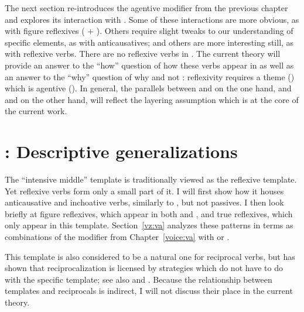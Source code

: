 The next section re-introduces the agentive modifier {\va} from the previous chapter and explores its interaction with {\vz}. Some of these interactions are more obvious, as with figure reflexives ({\va} + {\pz}). Others require slight tweaks to our understanding of specific elements, as with anticausatives; and others are more interesting still, as with reflexive verbs. There are no reflexive verbs in {\tnif}. The current theory will provide an answer to the ``how'' question of how these verbs appear in {\thit} as well as an answer to the ``why'' question of why {\thit} and not {\tnif}: reflexivity requires a theme (\vz) which is agentive (\va). In general, the parallels between {\tkal} and {\thif} on the one hand, and {\tpie} and {\thit} on the other hand, will reflect the layering assumption which is at the core of the current work. 


\section{\thit: Descriptive generalizations} \label{vz:thit}
The ``intensive middle'' template {\thit} is traditionally viewed as the reflexive template. Yet reflexive verbs form only a small part of it. I will first show how it houses anticausative and inchoative verbs, similarly to {\tnif}, but not passives. I then look briefly at figure reflexives, which appear in both {\tnif} and {\thit}, and true reflexives, which only appear in this template. Section~\ref{vz:va} analyzes these patterns in terms as combinations of the modifier {\va} from Chapter~\ref{voice:va} with {\vz} or {\pz}.

This template is also considered to be a natural one for reciprocal verbs, but \cite{barashersiegal16mmm} has shown that reciprocalization is licensed by strategies which do not have to do with the specific template; see also \cite{siloni12} and \cite{poortmanetal18}. Because the relationship between templates and reciprocals is indirect, I will not discuss their place in the current theory.
 
%	



